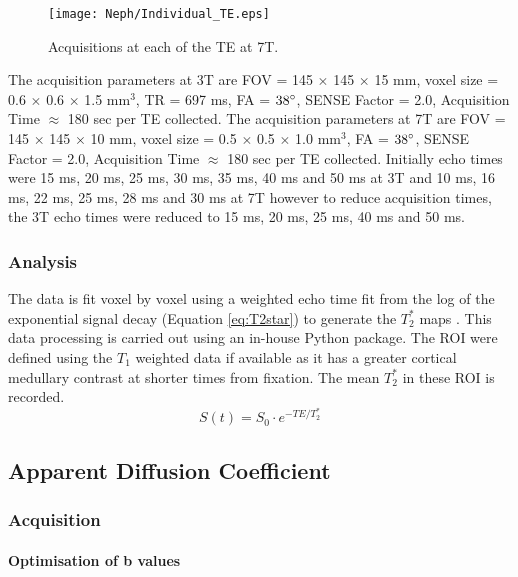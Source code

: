 \begin{figure}[H]
	\centering
	\texttt{[image: Neph/Individual\_TE.eps]}
	\caption{Acquisitions at each of the \ac{TE} at 7T.}
	\label{fig:echo_raw_data}	
\end{figure}

The acquisition parameters at 3T are \ac{FOV} = 145 $\times$ 145 $\times$ 15 mm, voxel size = 0.6 $\times$ 0.6 $\times$ 1.5 mm$^3$, \ac{TR} = 697 ms, \ac{FA} = $38\degree$, \ac{SENSE} Factor = 2.0, Acquisition Time $\approx$ 180 sec per \ac{TE} collected. 
The acquisition parameters at 7T are \ac{FOV} = 145 $\times$ 145 $\times$ 10 mm, voxel size = 0.5 $\times$ 0.5 $\times$ 1.0 mm$^3$, \ac{FA} = $38\degree$, \ac{SENSE} Factor = 2.0, Acquisition Time $\approx$ 180 sec per \ac{TE} collected. Initially echo times were 15 ms, 20 ms, 25 ms, 30 ms, 35 ms, 40 ms and 50 ms at 3T and 10 ms, 16 ms, 22 ms, 25 ms, 28 ms and 30 ms at 7T however to reduce acquisition times, the 3T echo times were reduced to 15 ms, 20 ms, 25 ms, 40 ms and 50 ms.

\subsubsection{Analysis}
The data is fit voxel by voxel using a weighted echo time fit from the log of the exponential signal decay (Equation \eqref{eq:T2star}) to generate the $T_2^*$ maps \cite{cox_multiparametric_2017}. This data processing is carried out using an in-house Python package. The \ac{ROI} were defined using the $T_1$ weighted data if available as it has a greater cortical medullary contrast at shorter times from fixation. The mean $T_2^*$ in these \ac{ROI} is recorded.
\begin{equation}
S(t) = S_0 \cdot e^{-TE/T_2^*}
\label{eq:T2star}
\end{equation}

\subsection{Apparent Diffusion Coefficient}
\subsubsection{Acquisition}
\paragraph{Optimisation of b values}

